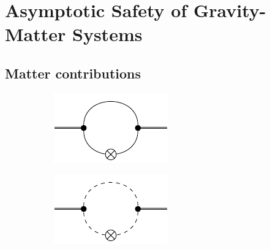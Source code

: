 \chapter{Asymptotic Safety of Gravity-Matter Systems}
\blindtext
\section{Matter contributions}
\blindtext

 \begin{figure}[H]
 \centering
 \hfill
 \begin{subfigure}{0.3\textwidth} 
	\includegraphics[width=\textwidth]{figs/TikZ/fermion_contribution}
 \end{subfigure}
 \hfill
 \begin{subfigure}{0.3\textwidth} 
 	\includegraphics[width=\textwidth]{figs/TikZ/scalar_contribution}
 \end{subfigure} 
 \hfill
 \begin{subfigure}{0.3\textwidth} 

\end{subfigure}
\end{figure}
